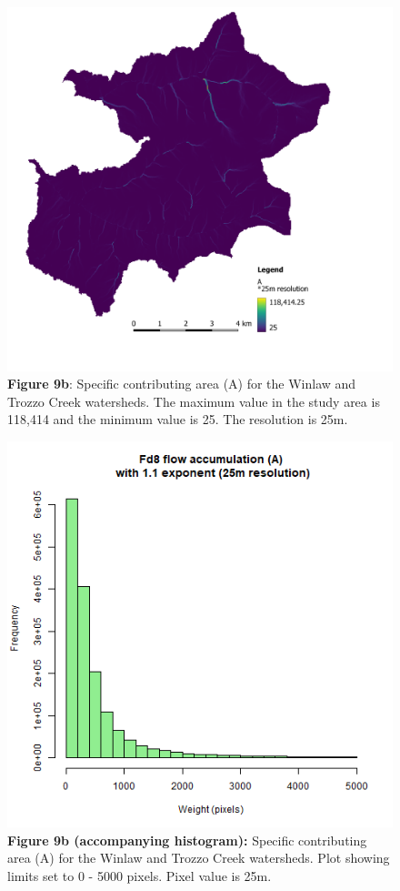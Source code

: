 \documentclass[
]{article}
\begin{document}
\begin{figure}
\centering
\includegraphics{img/a_25m.png}
\caption{\textbf{Figure 9b}: Specific contributing area (A) for the Winlaw and Trozzo Creek watersheds. The maximum value in the study area is 118,414 and the minimum value is 25. The resolution is 25m.}
\end{figure}

\begin{figure}
\centering
\includegraphics{img/FD8_25M_hist.png}
\caption{\textbf{Figure 9b (accompanying histogram):} Specific contributing area (A) for the Winlaw and Trozzo Creek watersheds. Plot showing limits set to 0 - 5000 pixels. Pixel value is 25m.}
\end{figure}
\end{document}
